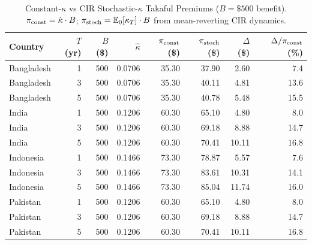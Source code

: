 \begin{table}
\caption{Constant-$\kappa$ vs CIR Stochastic-$\kappa$ Takaful Premiums ($B=\$500$ benefit). $\pi_{\rm const}=\hat{\kappa}\cdot B$; $\pi_{\rm stoch}=\mathbb{E}_0[\kappa_T]\cdot B$ from mean-reverting CIR dynamics.}
\label{tab:stoch_vs_const}
\begin{tabular}{lrrrrrrr}
\toprule
Country & $T$ (yr) & $B$ (\$) & $\hat{\kappa}$ & $\pi_{\rm const}$ (\$) & $\pi_{\rm stoch}$ (\$) & $\Delta$ (\$) & $\Delta/\pi_{\rm const}$ (\%) \\
\midrule
Bangladesh & 1 & 500 & 0.0706 & 35.30 & 37.90 & 2.60 & 7.4 \\
Bangladesh & 3 & 500 & 0.0706 & 35.30 & 40.11 & 4.81 & 13.6 \\
Bangladesh & 5 & 500 & 0.0706 & 35.30 & 40.78 & 5.48 & 15.5 \\
India & 1 & 500 & 0.1206 & 60.30 & 65.10 & 4.80 & 8.0 \\
India & 3 & 500 & 0.1206 & 60.30 & 69.18 & 8.88 & 14.7 \\
India & 5 & 500 & 0.1206 & 60.30 & 70.41 & 10.11 & 16.8 \\
Indonesia & 1 & 500 & 0.1466 & 73.30 & 78.87 & 5.57 & 7.6 \\
Indonesia & 3 & 500 & 0.1466 & 73.30 & 83.61 & 10.31 & 14.1 \\
Indonesia & 5 & 500 & 0.1466 & 73.30 & 85.04 & 11.74 & 16.0 \\
Pakistan & 1 & 500 & 0.1206 & 60.30 & 65.10 & 4.80 & 8.0 \\
Pakistan & 3 & 500 & 0.1206 & 60.30 & 69.18 & 8.88 & 14.7 \\
Pakistan & 5 & 500 & 0.1206 & 60.30 & 70.41 & 10.11 & 16.8 \\
\bottomrule
\end{tabular}
\end{table}

